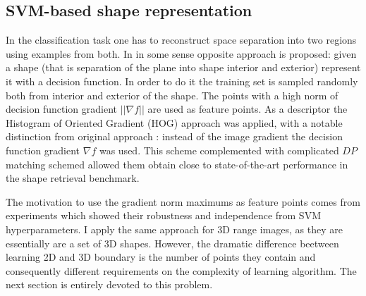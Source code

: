 \subsection{SVM-based shape representation}
In the classification task one has to reconstruct space separation into two regions using examples from both. In \cite	{SVS2013} in some sense opposite approach is proposed: given a shape (that is separation of the plane into shape interior and exterior) represent it with a decision function. In order to do it the training set is sampled randomly both from interior and exterior of the shape. The points with a high norm of decision function gradient $||\nabla f||$ are used as feature points. As a descriptor the Histogram of Oriented Gradient (HOG) approach was applied, with a notable  distinction from original approach \cite{dalal2005histograms}: instead of the image gradient the decision function gradient $\nabla f$ was used. This scheme complemented with complicated $DP$ matching schemed allowed them obtain close to state-of-the-art performance in the shape retrieval benchmark.

The motivation to use the gradient norm maximums as feature points comes from experiments which showed their robustness and independence from SVM hyperparameters.  I apply the same approach for 3D range images, as they are essentially are a set of 3D shapes. However, the dramatic difference beetween learning 2D and 3D boundary is the number of points they contain and consequently different requirements on the complexity of learning algorithm. The next section is entirely devoted to this problem.
